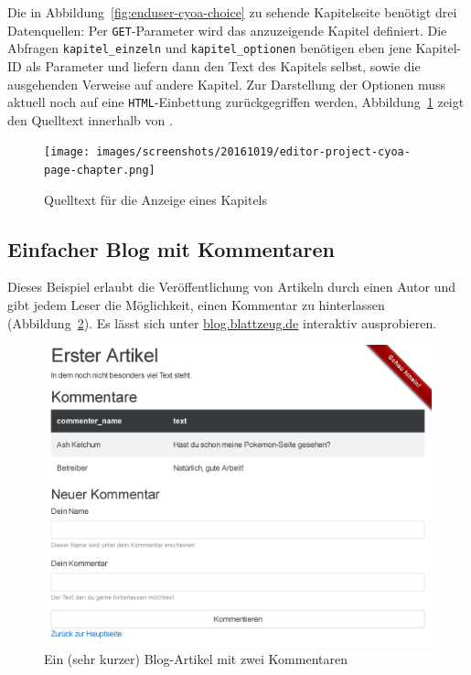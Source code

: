Die in Abbildung~\ref{fig:enduser-cyoa-choice} zu sehende Kapitelseite benötigt drei Datenquellen: Per \texttt{GET}-Parameter wird das anzuzeigende Kapitel definiert. Die Abfragen \texttt{kapitel\_einzeln} und \texttt{kapitel\_optionen} benötigen eben jene Kapitel-ID als Parameter und liefern dann den Text des Kapitels selbst, sowie die ausgehenden Verweise auf andere Kapitel. Zur Darstellung der Optionen muss aktuell noch auf eine \texttt{HTML}-Einbettung zurückgegriffen werden, Abbildung~\ref{fig:project-cyoa-page-chapter} zeigt den Quelltext innerhalb von \idename{}.

\begin{figure}[h]
  \centering \texttt{[image: images/screenshots/20161019/editor-project-cyoa-page-chapter.png]}
  \caption{Quelltext für die Anzeige eines Kapitels}
  \label{fig:project-cyoa-page-chapter}
\end{figure}

\subsection{Einfacher Blog mit Kommentaren}

Dieses Beispiel erlaubt die Veröffentlichung von Artikeln durch einen Autor und gibt jedem Leser die Möglichkeit, einen Kommentar zu hinterlassen (Abbildung~\ref{fig:enduser-blog-article}). Es lässt sich unter \href{http://blog.blattzeug.de/}{blog.blattzeug.de} interaktiv ausprobieren.

\begin{figure}[h]
  \centering \includegraphics[width=\textwidth-2pt,frame]{images/screenshots/20161019/enduser-blog-article.png}
  \caption{Ein (sehr kurzer) Blog-Artikel mit zwei Kommentaren}
  \label{fig:enduser-blog-article}
\end{figure}

